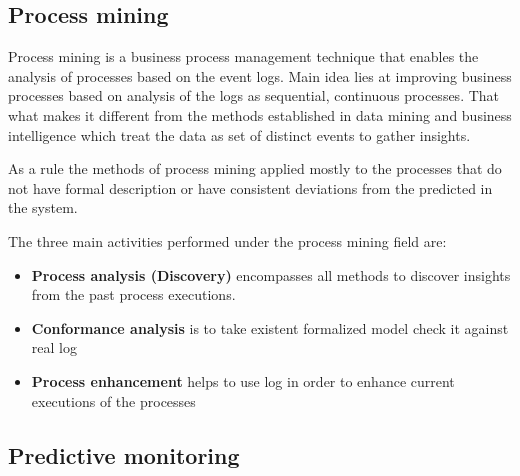 \subsection{Process mining}

Process mining is a business process management technique that enables the analysis of processes based on the event logs. Main idea lies at improving business processes based on analysis of the logs as sequential, continuous processes. That what makes it different from the methods established in data mining and business intelligence which treat the data as set of distinct events to gather insights. 

As a rule the methods of process mining applied mostly to the processes that do not have formal description or have consistent deviations from the predicted in the system. 

The three main activities performed under the process mining field are:

\begin{itemize}
	\item \textbf{Process analysis (Discovery)} encompasses all methods to discover insights from the past process executions. 
	\item \textbf{Conformance analysis} is to take existent formalized model check it against real log
	\item \textbf{Process enhancement} helps to use log in order to enhance current executions of the processes
\end{itemize}
 


\subsection{Predictive monitoring}

